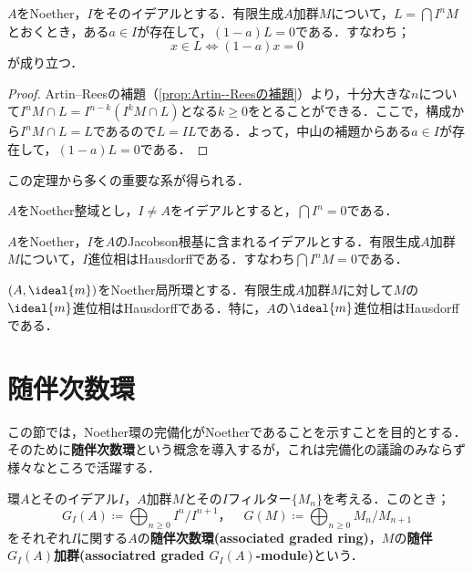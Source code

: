 \begin{thm}[Krullの交叉定理]
	$A$をNoether，$I$をそのイデアルとする．有限生成$A$加群$M$について，$L=\bigcap I^nM$とおくとき，ある$a\in I$が存在して，$(1-a)L=0$である．すなわち；
	\[x\in L\Longleftrightarrow (1-a)x=0\]
	が成り立つ．
\end{thm}

\begin{proof}
	Artin--Reesの補題（\ref{prop:Artin--Reesの補題}）より，十分大きな$n$について$I^n M\cap L=I^{n-k}(I^kM\cap L)$となる$k\geq0$をとることができる．ここで，構成から$I^n M\cap L=L$であるので$L=IL$である．よって，中山の補題からある$a\in I$が存在して，$(1-a)L=0$である．
\end{proof}

この定理から多くの重要な系が得られる．

\begin{cor}\label{cor:Noetherならbigcap I^n=0}
	$A$をNoether整域とし，$I\neq A$をイデアルとすると，$\bigcap I^n=0$である．
\end{cor}

\begin{cor}\label{cor:Krullの交叉定理の系}
	$A$をNoether，$I$を$A$のJacobson根基に含まれるイデアルとする．有限生成$A$加群$M$について，$I$進位相はHausdorffである．すなわち$\bigcap I^nM=0$である．
\end{cor}

\begin{cor}
	$(A,\ideal{m})$をNoether局所環とする．有限生成$A$加群$M$に対して$M$の$\ideal{m}$進位相はHausdorffである．特に，$A$の$\ideal{m}$進位相はHausdorffである．
\end{cor}
\section{随伴次数環}

この節では，Noether環の完備化がNoetherであることを示すことを目的とする．そのために\textbf{随伴次数環}という概念を導入するが，これは完備化の議論のみならず様々なところで活躍する．

\begin{defi}[随伴次数環]\label{defi:随伴次数環}
	環$A$とそのイデアル$I$，$A$加群$M$とその$I$フィルター$\{M_n\}$を考える．このとき；
	\[G_I(A)\coloneq\bigoplus_{n\geq0}I^n/I^{n+1}，\quad G(M)\coloneq\bigoplus_{n\geq0}M_n/M_{n+1}\]
	をそれぞれ$I$に関する$A$の\textbf{随伴次数環(associated graded ring)}，$M$の\textbf{随伴}$G_I(A)$\textbf{加群(associatred graded $G_I(A)$-module)}という．
\end{defi}

